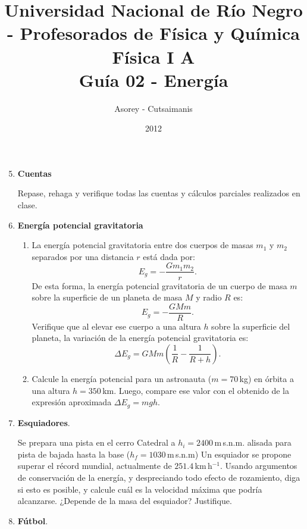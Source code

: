 \documentclass[a4paper,12pt]{article}
\begin{document}
\title{
{\normalsize{Universidad Nacional de Río Negro - Profesorados de Física y Química}}\\
Física I A \\ Guía 02 - Energía}
\author{Asorey - Cutsaimanis}
\date{2012}
\maketitle

\begin{enumerate}
\setcounter{enumi}{4}      %

\item {\bf{Cuentas}}

Repase, rehaga y verifique todas las cuentas y cálculos parciales realizados en
clase.

\item {\bf{Energía potencial gravitatoria}}

\begin{enumerate}
\item La energía potencial gravitatoria entre dos cuerpos de masas $m_1$ y $m_2$
separados por una distancia $r$ está dada por: 
\[
E_g = -\frac{G m_1 m_2}{r}.
\]
De esta forma, la energía potencial gravitatoria de un cuerpo de masa $m$ sobre
la superficie de un planeta de masa $M$ y radio $R$ es: 
\[
E_g = -\frac{G M m}{R}.
\]
Verifique que al elevar ese cuerpo a una altura $h$ sobre la superficie del
planeta, la variación de la energía potencial gravitatoria es: 
\[
\Delta E_g = G M m \left ( \frac{1}{R} - \frac{1}{R+h} \right ).
\]
\item Calcule la energía potencial para un astronauta ($m=70$\,kg) en órbita a
una altura $h=350$\,km. Luego, compare ese valor con el obtenido de la expresión 
aproximada $\Delta E_g = m g h$.
\end{enumerate} 

\item{\bf{Esquiadores}}.

Se prepara una pista en el cerro Catedral a $h_i=2400$\,m\,s.n.m. alisada para
pista de bajada hasta la base ($h_f=1030$\,m\,s.n.m) Un esquiador se propone
superar el récord mundial, actualmente de $251.4$\,km\,h$^{-1}$. Usando
argumentos de conservación de la energía, y despreciando todo efecto de
rozamiento, diga si esto es posible, y calcule cuál es la velocidad máxima que
podría alcanzarse. ¿Depende de la masa del esquiador? Justifique.

\item{\bf{Fútbol}}.


\end{enumerate}
\end{document}
